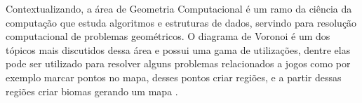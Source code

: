 




Contextualizando, a área de Geometria Computacional é um ramo da ciência da computação que estuda algoritmos e estruturas de dados, servindo para resolução computacional de problemas geométricos. O diagrama de Voronoi é um dos tópicos mais discutidos dessa
área e possui uma gama de utilizações, dentre elas pode ser utilizado para resolver alguns problemas relacionados a jogos como por exemplo marcar pontos no mapa, desses pontos criar regiões, e a partir dessas regiões criar biomas gerando um mapa \space\cite{rodrigues_diagrama_2019}.



